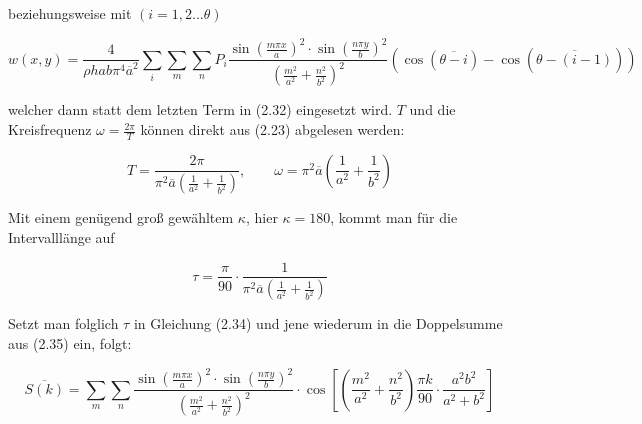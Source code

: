 beziehungsweise mit $(i=1,2 ... \theta)$ 

\begin{equation}
 	w(x,y) = \frac{4}{\rho h a b \pi^4 \overline{a}^2} \sum_i \sum_m \sum_n P_{i} \frac{\sin \left( \frac{m \pi x}{a} \right)^2 \cdot \sin \left( \frac{n \pi y}{b} \right)^2}{ \left( \frac{m^2}{a^2} + \frac{n^2}{b^2} \right)^2} \left( \cos(\overline{\theta - i}) - \cos(\overline{\theta - (i-1)}) \right)
\end{equation}

welcher dann statt dem letzten Term in (2.32) eingesetzt wird. $T$ und die Kreisfrequenz $\omega = \frac{2 \pi}{T}$ können direkt aus (2.23) abgelesen werden: 

\begin{equation}
	T = \frac{2 \pi}{\pi^2 \overline{a} \left( \frac{1}{a^2} + \frac{1}{b^2} \right) }, \qquad \omega=\pi^2 \overline{a} \left( \frac{1}{a^2}+\frac{1}{b^2} \right)
\end{equation}

Mit einem genügend groß gewähltem $\kappa$, hier $\kappa=180$, kommt man für die Intervalllänge auf

\begin{equation}
	\tau = \frac{\pi}{90} \cdot \frac{1}{\pi^2 \overline{a} \left( \frac{1}{a^2} + \frac{1}{b^2} \right) }
\end{equation}

Setzt man folglich $\tau$ in Gleichung (2.34) und jene wiederum in die Doppelsumme aus (2.35) ein, folgt:

\begin{equation}
	\overline{S(k)} = \sum_m \sum_n \frac{\sin \left( \frac{m \pi x}{a} \right)^2 \cdot \sin \left( \frac{n \pi y}{b} \right)^2}{ \left( \frac{m^2}{a^2} + \frac{n^2}{b^2} \right)^2} \cdot \cos \left[ \left( \frac{m^2}{a^2}+\frac{n^2}{b^2} \right) \frac{\pi k}{90} \cdot \frac{a^{2}b^{2}}{a^{2}+b^{2}} \right] 
\end{equation}



